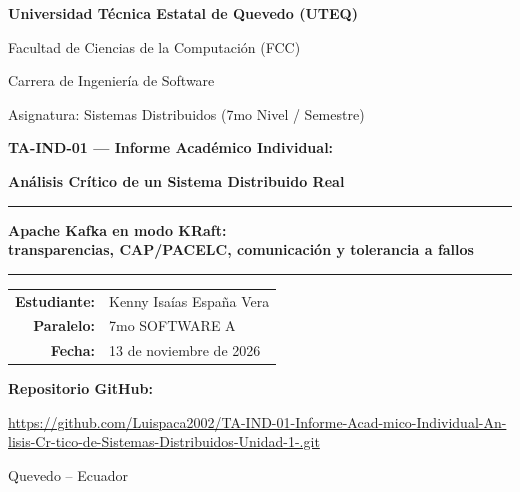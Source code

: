 \documentclass[11pt,a4paper]{article}
\begin{document}
\begin{titlepage}
\thispagestyle{empty}
\centering
{\Large\bfseries Universidad Técnica Estatal de Quevedo (UTEQ)\par}
\vspace{0.3cm}
{\large Facultad de Ciencias de la Computación (FCC)\par}
\vspace{0.2cm}
{\large Carrera de Ingeniería de Software\par}
\vspace{1.8cm}
{\large Asignatura: Sistemas Distribuidos (7mo Nivel / Semestre)\par}
\vspace{1.5cm}
{\large\bfseries TA-IND-01 --- Informe Académico Individual:\par}
\vspace{0.2cm}
{\large\bfseries Análisis Crítico de un Sistema Distribuido Real\par}
\vspace{1cm}
\rule{0.85\textwidth}{0.4pt}\par
\vspace{0.4cm}
{\LARGE\bfseries Apache Kafka en modo KRaft:\\[0.2cm]
transparencias, CAP/PACELC, comunicación y tolerancia a fallos\par}
\vspace{0.4cm}
\rule{0.85\textwidth}{0.4pt}\par
\vfill
\begin{tabular}{>{\bfseries}r l}
Estudiante: & Kenny Isaías España Vera \\[0.15cm]
Paralelo:   & 7mo SOFTWARE A \\[0.15cm]
Fecha:      & 13 de noviembre de 2026 \\
\end{tabular}
\vspace{1.2cm}

{\bfseries Repositorio GitHub:}\par
\vspace{0.15cm}
{\small\url{https://github.com/Luispaca2002/TA-IND-01-Informe-Acad-mico-Individual-An-lisis-Cr-tico-de-Sistemas-Distribuidos-Unidad-1-.git}\par}
\vspace{1cm}
{\large Quevedo -- Ecuador\par}
\end{titlepage}
\end{document}

